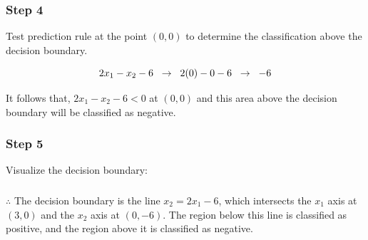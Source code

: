 \documentclass{article}
\begin{document}
\subsubsection*{Step 4}
\parbox{\textwidth}{
Test prediction rule at the point $(0,0)$ to determine the classification above the decision boundary.

$$2 x_{1} - x_{2} - 6 \hspace{0.2cm} \rightarrow \hspace{0.2cm}  2(0) - 0 - 6 \hspace{0.2cm} \rightarrow \hspace{0.2cm} -6$$

It follows that, $2 x_{1} - x_{2} - 6 < 0$  at $(0,0)$ and this area above the decision boundary will be classified as negative. 

}

\subsubsection*{Step 5}
\parbox{\textwidth}{
Visualize the decision boundary:
}

\begin{center}
\end{center}

\subsubsection*{\normalfont}{$\therefore$ The decision boundary is the line $x_2 = 2x_1 - 6$, which intersects the $x_{1}$ axis at $(3,0)$ and the  $x_{2}$ axis at $(0,-6)$. The region below this line is classified as positive, and the region above it is classified as negative.}
\end{document}
